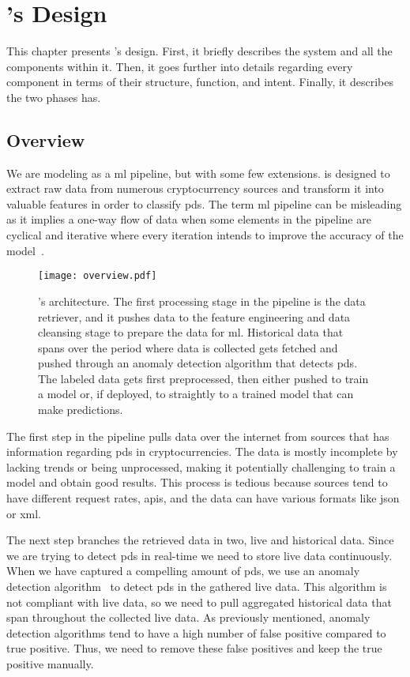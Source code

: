 \chapter{\project's Design}\label{ch:design}\glsresetall
This chapter presents \project's design. First, it briefly describes the system and all the components within it. Then, it goes further into details regarding every component in terms of their structure, function, and intent. Finally, it describes the two phases \project has.

\section{Overview}
We are modeling \project as a \ac{ml} pipeline, but with some few extensions. \project is designed to extract raw data from numerous cryptocurrency sources and transform it into valuable features in order to classify \acp{pd}. The term \ac{ml} pipeline can be misleading as it implies a one-way flow of data when some elements in the pipeline are cyclical and iterative where every iteration intends to improve the accuracy of the model~\cite{ml_pipeline_3}. 

\begin{figure}[ht]
    \centering
    \texttt{[image: overview.pdf]}
    \caption[\project's architecture]{\project's architecture. The first processing stage in the pipeline is the data retriever, and it pushes data to the feature engineering and data cleansing stage to prepare the data for \ac{ml}. Historical data that spans over the period where data is collected gets fetched and pushed through an anomaly detection algorithm that detects \acp{pd}. The labeled data gets first preprocessed, then either pushed to train a model or, if deployed, to straightly to a trained model that can make predictions.}
    \label{fig:overview}
\end{figure}

The first step in the pipeline pulls data over the internet from sources that has information regarding \acp{pd} in cryptocurrencies. The data is mostly incomplete by lacking trends or being unprocessed, making it potentially challenging to train a model and obtain good results. This process is tedious because sources tend to have different request rates, \acp{api}, and the data can have various formats like \ac{json} or \ac{xml}.

The next step branches the retrieved data in two, live and historical data. Since we are trying to detect \acp{pd} in real-time we need to store live data continuously. When we have captured a compelling amount of \acp{pd}, we use an anomaly detection algorithm~\cite{P&D_to_the_moon} to detect \acp{pd} in the gathered live data. This algorithm is not compliant with live data, so we need to pull aggregated historical data that span throughout the collected live data. As previously mentioned, anomaly detection algorithms tend to have a high number of false positive compared to true positive. Thus, we need to remove these false positives and keep the true positive manually.


